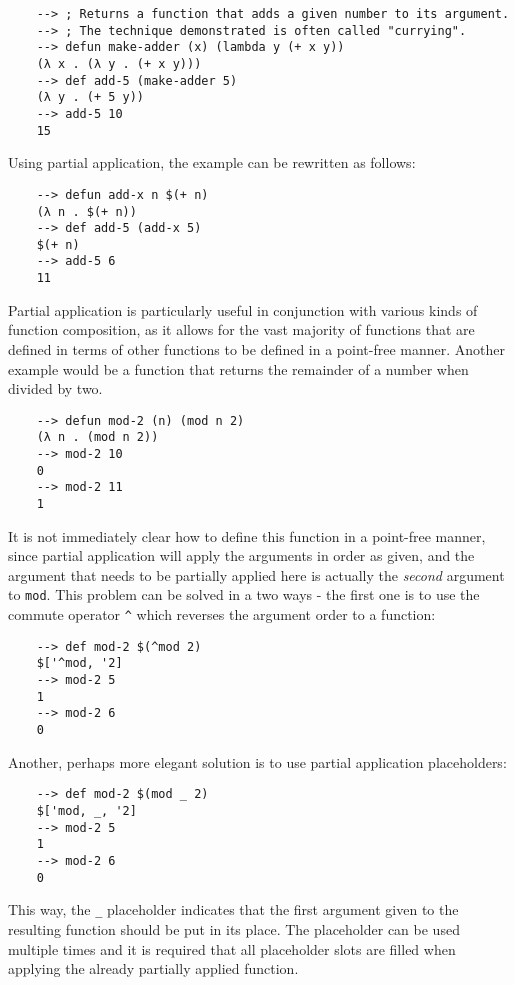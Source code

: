\begin{Verbatim}
    --> ; Returns a function that adds a given number to its argument.
    --> ; The technique demonstrated is often called "currying".
    --> defun make-adder (x) (lambda y (+ x y))
    (λ x . (λ y . (+ x y)))
    --> def add-5 (make-adder 5)
    (λ y . (+ 5 y))
    --> add-5 10
    15
\end{Verbatim}

Using partial application, the example can be rewritten as follows:

\begin{Verbatim}
    --> defun add-x n $(+ n)
    (λ n . $(+ n))
    --> def add-5 (add-x 5)
    $(+ n)
    --> add-5 6
    11
\end{Verbatim}

Partial application is particularly useful in conjunction with various kinds of function composition, as it allows for the vast majority of functions that are defined in terms of other functions to be defined in a point-free manner. Another example would be a function that returns the remainder of a number when divided by two.

\begin{Verbatim}
    --> defun mod-2 (n) (mod n 2)
    (λ n . (mod n 2))
    --> mod-2 10
    0
    --> mod-2 11
    1
\end{Verbatim}

It is not immediately clear how to define this function in a point-free manner, since partial application will apply the arguments in order as given, and the argument that needs to be partially applied here is actually the \textit{second} argument to \verb|mod|. This problem can be solved in a two ways - the first one is to use the commute operator \verb|^| which reverses the argument order to a function:

\begin{Verbatim}
    --> def mod-2 $(^mod 2)
    $['^mod, '2]
    --> mod-2 5
    1
    --> mod-2 6
    0
\end{Verbatim}

Another, perhaps more elegant solution is to use partial application placeholders:

\begin{Verbatim}
    --> def mod-2 $(mod _ 2)
    $['mod, _, '2]
    --> mod-2 5
    1
    --> mod-2 6
    0
\end{Verbatim}

This way, the \verb|_| placeholder indicates that the first argument given to the resulting function should be put in its place. The placeholder can be used multiple times and it is required that all placeholder slots are filled when applying the already partially applied function.

